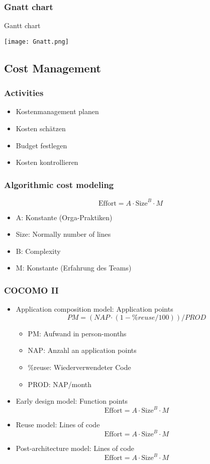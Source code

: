 \subsubsection{Gnatt chart}
\begin{table}[H]
\caption{Gantt chart}
\begin{center}
	\texttt{[image: Gnatt.png]}
\end{center}	
\end{table}
\subsection{Cost Management}
\subsubsection{Activities}
\begin{itemize}
	\item Kostenmanagement planen
	\item Kosten schätzen
	\item Budget festlegen
	\item Kosten kontrollieren
\end{itemize}
\subsubsection{Algorithmic cost modeling}
$$
	\text{Effort} = A \cdot \text{Size}^B \cdot M
$$
\begin{itemize}
	\item A: Konstante (Orga-Praktiken)
	\item Size: Normally number of lines
	\item B: Complexity
	\item M: Konstante (Erfahrung des Teams)
\end{itemize}
\subsubsection{COCOMO II}
\begin{itemize}
	\item Application composition model: Application points
		$$
			PM = (NAP\cdot(1-\%reuse/100))/PROD
		$$
		\begin{itemize}
			\item PM: Aufwand in person-months
			\item NAP: Anzahl an application points
			\item \%reuse: Wiederverwendeter Code
			\item PROD: NAP/month
		\end{itemize}
	\item Early design model: Function points
		$$
			\text{Effort} = A \cdot \text{Size}^B \cdot M
		$$
	\item Reuse model: Lines of code
		$$
			\text{Effort} = A \cdot \text{Size}^B \cdot M
		$$
	\item Post-architecture model: Lines of code
		$$
			\text{Effort} = A \cdot \text{Size}^B \cdot M
		$$
\end{itemize}
